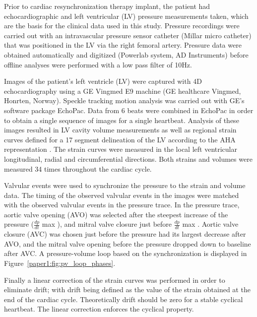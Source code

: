 Prior to cardiac resynchronization therapy implant,
the patient had echocardiographic and left ventricular (LV)
pressure measurements taken, which are the basis for the clinical
data used in this study. Pressure recordings were carried out
with an intravascular pressure sensor catheter
(Millar micro catheter) that was positioned in the LV
via the right femoral artery. Pressure data were
obtained automatically and digitized (Powerlab system, AD Instruments) 
before offline analyses were performed with a low pass filter of 10Hz.

Images of the patient's left ventricle (LV) were captured with 4D
echocardiography using a GE Vingmed E9 machine (GE healthcare Vingmed, Honrten, Norway).
Speckle tracking motion analysis was carried out with GE's software package
EchoPac. Data from 6 beats were combined in EchoPac in order 
to obtain a single sequence of images for a single heartbeat. Analysis 
of these images resulted in LV cavity volume measurements as well as
regional strain curves defined for a 17 segment delineation of the LV
according to the AHA representation \cite{cerqueira2002standardized}.
The strain curves were measured in
the local left ventricular longitudinal, radial and circumferential
directions. Both strains and volumes were measured 34 times throughout the
cardiac cycle.

Valvular events were used to synchronize the pressure to the strain and
volume data. The timing of the observed valvular events in the images
were matched with the observed valvular events in the pressure
trace. In the pressure trace, aortic valve opening (AVO) was selected after the
steepest increase of the pressure ($\frac{dp}{dt}$ max ), and mitral valve
closure just before $\frac{dp}{dt}$ max . Aortic
valve closure (AVC) was chosen just before the pressure had its largest
decrease after AVO, and the mitral valve opening
before the pressure dropped down to baseline after AVC. 
A pressure-volume loop based on the synchronization is displayed in
Figure~\ref{paper1:fig:pv_loop_phases}.

Finally a linear correction of the strain curves was performed in order to 
eliminate drift; with drift being defined as the value of the strain obtained at
the end of the cardiac cycle. Theoretically drift should be zero for a stable cyclical heartbeat.
The linear correction enforces the cyclical property.

